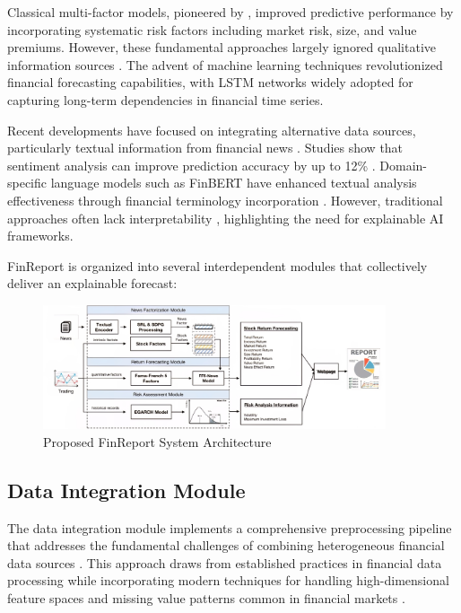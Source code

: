 \documentclass[3p,times,procedia]{elsarticle}
\begin{document}
Classical multi-factor models, pioneered by \cite{FAMA1993}, improved predictive performance by incorporating systematic risk factors including market risk, size, and value premiums. However, these fundamental approaches largely ignored qualitative information sources \cite{Malkiel2003,Chen2015}. The advent of machine learning techniques revolutionized financial forecasting capabilities, with LSTM networks \cite{Fischer2018,Bao2017} widely adopted for capturing long-term dependencies in financial time series.

Recent developments have focused on integrating alternative data sources, particularly textual information from financial news \cite{Schumaker2009,Xing2018,TETLOCK2007}. Studies show that sentiment analysis can improve prediction accuracy by up to 12\% \cite{Ding2015}. Domain-specific language models such as FinBERT \cite{Araci2019} have enhanced textual analysis effectiveness through financial terminology incorporation \cite{Loughran2011}. However, traditional approaches often lack interpretability \cite{Ribeiro2016}, highlighting the need for explainable AI frameworks.

FinReport is organized into several interdependent modules that collectively deliver an explainable forecast:
\begin{figure}[!ht] %
    \centering
    \includegraphics[width=0.90\textwidth]{flowchart.jpg} %

    \caption{Proposed FinReport System Architecture}
    \label{fig:workflow_diagram}
\end{figure}
\subsection{{Data Integration Module}}

The data integration module implements a comprehensive preprocessing pipeline that addresses the fundamental challenges of combining heterogeneous financial data sources \cite{Harvey2016}. This approach draws from established practices in financial data processing while incorporating modern techniques for handling high-dimensional feature spaces and missing value patterns common in financial markets \cite{Campbell2001}.
\end{document}
